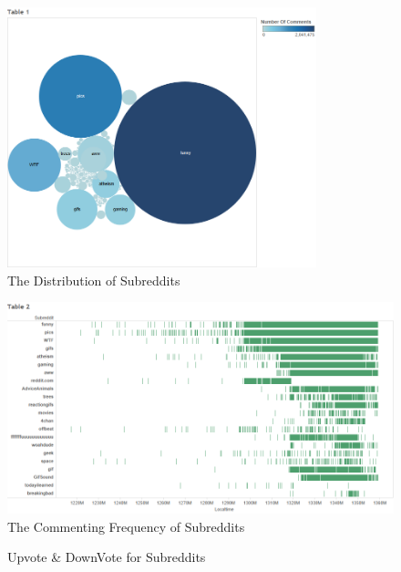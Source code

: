 \documentclass[a4paper]{article}
\begin{document}
\begin{figure}
\centering
\includegraphics[width=0.8\textwidth]{topicss.png}
\centering
\caption{\label{fig:topics}The Distribution of Subreddits}
\end{figure}
\begin{figure}
\centering
\includegraphics[width=1\textwidth]{times.png}
\centering
\caption{\label{fig:freq}The Commenting Frequency of Subreddits}
\end{figure}
\begin{figure}
\centering
{}
\centering
\caption{\label{fig:votes}Upvote \& DownVote for Subreddits}
\end{figure}
\end{document}
